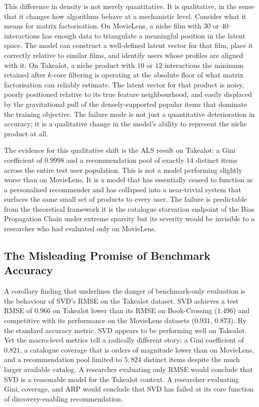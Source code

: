\documentclass[11pt,a4paper]{report}
\begin{document}
This difference in density is not merely quantitative. It is qualitative, in the sense that it changes how algorithms behave at a mechanistic level. Consider what it means for matrix factorisation. On MovieLens, a niche film with $30$ or $40$ interactions has enough data to triangulate a meaningful position in the latent space. The model can construct a well-defined latent vector for that film, place it correctly relative to similar films, and identify users whose profiles are aligned with it. On Takealot, a niche product with $10$ or $12$ interactions the minimum retained after $k$-core filtering is operating at the absolute floor of what matrix factorisation can reliably estimate. The latent vector for that product is noisy, poorly positioned relative to its true feature neighbourhood, and easily displaced by the gravitational pull of the densely-supported popular items that dominate the training objective. The failure mode is not just a quantitative deterioration in accuracy; it is a qualitative change in the model's ability to represent the niche product at all.

The evidence for this qualitative shift is the ALS result on Takealot: a Gini coefficient of $0.9998$ and a recommendation pool of exactly $14$ distinct items across the entire test user population. This is not a model performing slightly worse than on MovieLens. It is a model that has essentially ceased to function as a personalised recommender and has collapsed into a near-trivial system that surfaces the same small set of products to every user. The failure is predictable from the theoretical framework it is the catalogue starvation endpoint of the Bias Propagation Chain under extreme sparsity but its severity would be invisible to a researcher who had evaluated only on MovieLens.

\subsection*{The Misleading Promise of Benchmark Accuracy}

A corollary finding that underlines the danger of benchmark-only evaluation is the behaviour of SVD's RMSE on the Takealot dataset. SVD achieves a test RMSE of $0.966$ on Takealot lower than its RMSE on Book-Crossing ($1.496$) and competitive with its performance on the MovieLens datasets ($0.931$, $0.873$). By the standard accuracy metric, SVD appears to be performing well on Takealot. Yet the macro-level metrics tell a radically different story: a Gini coefficient of $0.821$, a catalogue coverage that is orders of magnitude lower than on MovieLens, and a recommendation pool limited to $5{,}824$ distinct items despite the much larger available catalog. A researcher evaluating only RMSE would conclude that SVD is a reasonable model for the Takealot context. A researcher evaluating Gini, coverage, and ARP would conclude that SVD has failed at its core function of discovery-enabling recommendation.
\end{document}
